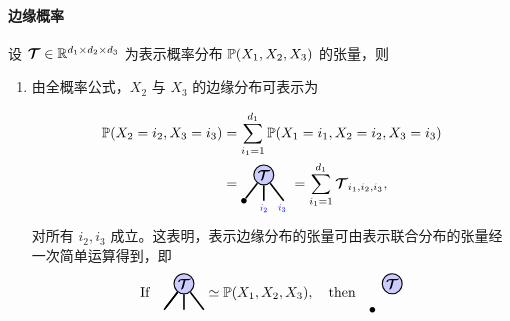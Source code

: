 \paragraph{边缘概率}
设 $\bm{\mathcal{T}}\in\mathbb{R}^{d_1\times d_2\times d_3}$ 为表示概率分布 $\mathbb{P}(X_1, X_2, X_3)$ 的张量，则 
\begin{enumerate}
    \item 由全概率公式，$X_2$ 与 $X_3$ 的边缘分布可表示为
    
\begin{align*}
    \PP(X_2=i_2,X_3=i_3) 
    &=
    \sum_{i_1=1}^{d_1}\PP(X_1= i_1,X_2=i_2,X_3=i_3) \\
    &= 
\begin{tikzpicture}[baseline=\baseline]
    \tikzset{tensor/.style = {minimum size = 0.5cm,shape = circle,thick,draw=black,inner sep = 0pt}, edge/.style = {thick,line width=.4mm},every loop/.style={}}
    \def\y{0.25}
    \def\x{0}
    \node[tensor,fill=blue!20!white] (T) at (\x,\y) {$\Tt$};
    \draw  node[fill = black,circle,inner sep=0pt,minimum size=4pt] (m_1) at (\x-0.5,\y-0.65) {};
    \draw[edge] (T) -- (m_1);
    \draw[edge](T) -- (\x,\y-0.65)node [very near end,below]
    {\scalebox{0.7}{\indcolor{$i_2$}}};
    \draw[edge](T) -- (\x+0.5,\y-0.65)node [very near end,below]
    {\scalebox{0.7}{\indcolor{$i_3$}}};
\end{tikzpicture}
 = \sum_{i_1=1}^{d_1}\Tt_{i_1,i_2,i_3},
\end{align*}
对所有 $i_2,i_3$ 成立。这表明，表示边缘分布的张量可由表示联合分布的张量经一次简单运算得到，即
\begin{align*}
    \text{If}~~~ \begin{tikzpicture}[baseline=\baseline]
    \tikzset{tensor/.style = {minimum size = 0.5cm,shape = circle,thick,draw=black,inner sep = 0pt}, edge/.style = {thick,line width=.4mm},every loop/.style={}}
    \def\y{0.25}
    \def\x{0}
    \node[tensor,fill=blue!20!white] (T) at (\x,\y) {$\Tt$};
    \draw[edge] (T) -- (\x-0.5,\y-0.65);
    \draw[edge] (T) -- (m_1);
    \draw[edge](T) -- (\x,\y-0.65);
    \draw[edge](T) -- (\x+0.5,\y-0.65);
\end{tikzpicture}\simeq\PP(X_1, X_2, X_3),~~~\text{then}~~~
\begin{tikzpicture}[baseline=\baseline]
    \tikzset{tensor/.style = {minimum size = 0.5cm,shape = circle,thick,draw=black,inner sep = 0pt}, edge/.style = {thick,line width=.4mm},every loop/.style={}}
    \def\y{0.25}
    \def\x{0}
    \node[tensor,fill=blue!20!white] (T) at (\x,\y) {$\Tt$};
    \draw  node[fill = black,circle,inner sep=0pt,minimum size=4pt] (m_1) at (\x-0.5,\y-0.65) {};

\end{tikzpicture}
\end{align*}
\end{enumerate}
